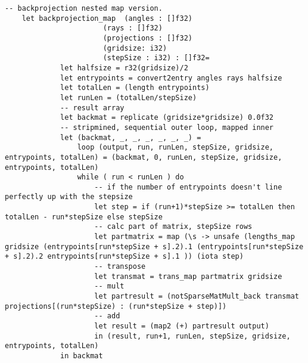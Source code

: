 \begin{lstlisting}[language=Futhark]
    -- backprojection nested map version.
    let backprojection_map  (angles : []f32)
                       (rays : []f32)
                       (projections : []f32)
                       (gridsize: i32)
                       (stepSize : i32) : []f32=
             let halfsize = r32(gridsize)/2
             let entrypoints = convert2entry angles rays halfsize
             let totalLen = (length entrypoints)
             let runLen = (totalLen/stepSize)
             -- result array
             let backmat = replicate (gridsize*gridsize) 0.0f32
             -- stripmined, sequential outer loop, mapped inner
             let (backmat, _, _, _, _, _, _) =
                 loop (output, run, runLen, stepSize, gridsize, entrypoints, totalLen) = (backmat, 0, runLen, stepSize, gridsize, entrypoints, totalLen)
                 while ( run < runLen ) do
                     -- if the number of entrypoints doesn't line perfectly up with the stepsize
                     let step = if (run+1)*stepSize >= totalLen then totalLen - run*stepSize else stepSize
                     -- calc part of matrix, stepSize rows
                     let partmatrix = map (\s -> unsafe (lengths_map gridsize (entrypoints[run*stepSize + s].2).1 (entrypoints[run*stepSize + s].2).2 entrypoints[run*stepSize + s].1 )) (iota step)
                     -- transpose
                     let transmat = trans_map partmatrix gridsize
                     -- mult
                     let partresult = (notSparseMatMult_back transmat projections[(run*stepSize) : (run*stepSize + step)])
                     -- add
                     let result = (map2 (+) partresult output)
                     in (result, run+1, runLen, stepSize, gridsize, entrypoints, totalLen)
             in backmat


\end{lstlisting}
